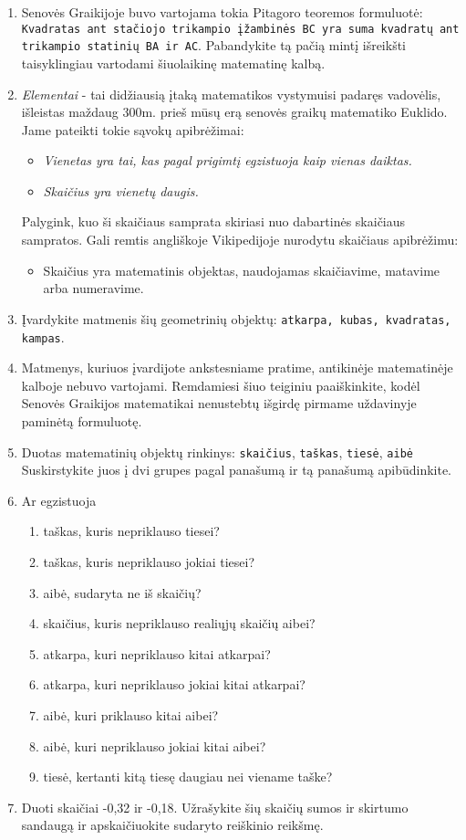 \documentclass[a4paper]{article}
\begin{document}
\begin{enumerate}
\item Senovės Graikijoje buvo vartojama tokia Pitagoro teoremos formuluotė: \texttt{Kvadratas ant stačiojo trikampio įžambinės BC yra suma kvadratų ant trikampio statinių BA ir AC}. Pabandykite tą pačią mintį išreikšti taisyklingiau vartodami šiuolaikinę matematinę kalbą.
\item \textit{Elementai} - tai didžiausią įtaką matematikos vystymuisi padaręs vadovėlis, išleistas maždaug 300m. prieš mūsų erą senovės graikų matematiko Euklido. Jame pateikti tokie sąvokų apibrėžimai:
\begin{itemize}
\item \textit{Vienetas yra tai, kas pagal prigimtį egzistuoja kaip vienas daiktas.}
\item \textit{Skaičius yra vienetų daugis.}
\end{itemize}
Palygink, kuo ši skaičiaus samprata skiriasi nuo dabartinės skaičiaus sampratos. Gali remtis angliškoje Vikipedijoje nurodytu skaičiaus apibrėžimu:
\begin{itemize}
\item Skaičius yra matematinis objektas, naudojamas skaičiavime, matavime arba numeravime.
\end{itemize}
\item Įvardykite matmenis šių geometrinių objektų: \texttt{atkarpa, kubas, kvadratas, kampas}.
\item Matmenys, kuriuos įvardijote ankstesniame pratime, antikinėje matematinėje kalboje nebuvo vartojami. Remdamiesi šiuo teiginiu paaiškinkite, kodėl Senovės Graikijos matematikai nenustebtų išgirdę pirmame uždavinyje paminėtą formuluotę.
\item Duotas matematinių objektų rinkinys: \texttt{skaičius}, \texttt{taškas}, \texttt{tiesė}, \texttt{aibė}
Suskirstykite juos į dvi grupes pagal panašumą ir tą panašumą apibūdinkite.
\item Ar egzistuoja
\begin{enumerate}
\item  taškas, kuris nepriklauso tiesei?
\item  taškas, kuris nepriklauso jokiai tiesei?
\item aibė, sudaryta ne iš skaičių?
\item  skaičius, kuris nepriklauso realiųjų skaičių aibei?
\item  atkarpa, kuri nepriklauso kitai atkarpai?
\item  atkarpa, kuri nepriklauso jokiai kitai atkarpai?
\item  aibė, kuri priklauso kitai aibei?
\item  aibė, kuri nepriklauso jokiai kitai aibei?
\item  tiesė, kertanti kitą tiesę daugiau nei viename taške?
\end{enumerate}
\item Duoti skaičiai -0,32 ir -0,18. Užrašykite šių skaičių sumos ir skirtumo sandaugą ir apskaičiuokite sudaryto reiškinio reikšmę.


\end{enumerate}
\end{document}
